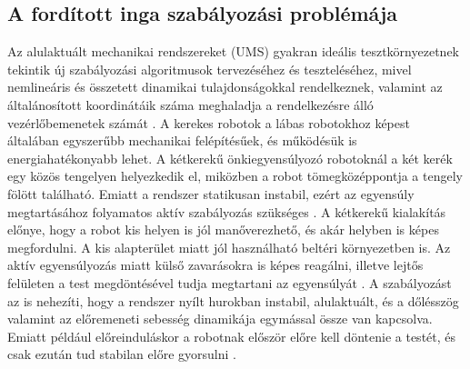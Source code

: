 \documentclass[12pt,a4paper]{report}
\begin{document}
	\subsection{A fordított inga szabályozási problémája}
	Az alulaktuált mechanikai rendszereket (UMS) gyakran ideális tesztkörnyezetnek tekintik új szabályozási algoritmusok tervezéséhez és teszteléséhez, mivel nemlineáris és összetett dinamikai tulajdonságokkal rendelkeznek, valamint az általánosított koordinátáik száma meghaladja a rendelkezésre álló vezérlőbemenetek számát \cite{chan2013}.
	\newline
	\newline
	A kerekes robotok a lábas robotokhoz képest általában egyszerűbb mechanikai felépítésűek, és működésük is energiahatékonyabb lehet. A kétkerekű önkiegyensúlyozó robotoknál a két kerék egy közös tengelyen helyezkedik el, miközben a robot tömegközéppontja a tengely fölött található. Emiatt a rendszer statikusan instabil, ezért az egyensúly megtartásához folyamatos aktív szabályozás szükséges \cite{chan2013}.
	\newline
	\newline
	A kétkerekű kialakítás előnye, hogy a robot kis helyen is jól manőverezhető, és akár helyben is képes megfordulni. A kis alapterület miatt jól használható beltéri környezetben is. Az aktív egyensúlyozás miatt külső zavarásokra is képes reagálni, illetve lejtős felületen a test megdöntésével tudja megtartani az egyensúlyát \cite{chan2013}.
	\newline
	\newline
	A szabályozást az is nehezíti, hogy a rendszer nyílt hurokban instabil, alulaktuált, és a dőlésszög valamint az előremeneti sebesség dinamikája egymással össze van kapcsolva. Emiatt például előreinduláskor a robotnak először előre kell döntenie a testét, és csak ezután tud stabilan előre gyorsulni \cite{chan2013}.
\end{document}
